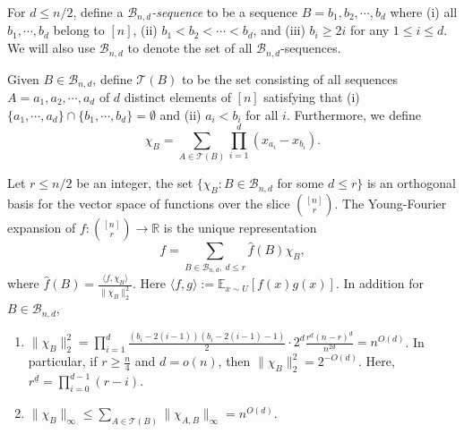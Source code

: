 \documentclass{toc}
\newcommand{\Braket}[1]{\langle#1\rangle}
\begin{document}
%
%
%
%
%
%
%
%
%
%
%
%
%
%
%
%
\begin{definition}
For $d\leq n/2$, define a \emph{$\mathcal{B}_{n,d}$-sequence} to be a sequence $B=b_1,b_2,\cdots,b_d$ where (i) all $b_1,\cdots,b_d$ belong to $[n]$, (ii) $b_1<b_2<\cdots<b_d$, and (iii) $b_i\geq 2i$ for any $1\leq i\leq d$.
We will also use $\mathcal{B}_{n,d}$ to denote the set of all  $\mathcal{B}_{n,d}$-sequences.  

Given $B\in\mathcal{B}_{n,d}$, define $\mathcal{T}(B)$ to be the set consisting of all sequences $A=a_1,a_2,\cdots,a_d$ of $d$ distinct elements of $[n]$ satisfying that (i) $\{a_1,\cdots,a_d\}\cap \{b_1,\cdots,b_d\}=\emptyset$ and (ii) $a_i<b_i$ for all $i$. Furthermore, we define
\begin{equation} 
\chi_B=\sum_{A\in \mathcal{T}(B)} \prod_{i=1}^d(x_{a_i}-x_{b_i}).
\end{equation} %
\end{definition}
%
\begin{theorem}\label{thm:def} %
Let $r\leq n/2$ be an integer, the set $\{\chi_B:B\in \mathcal{B}_{n,d}$ for some $d\leq r \}$ is an orthogonal basis for the vector space of functions over the slice 
%
$\binom{[n]}{r}$. %
The Young-Fourier expansion of $f:
%
\binom{[n]}{r} %
\rightarrow \mathbb{R}$ is the unique representation
%
\begin{equation} %
f=\sum_{B\in \mathcal{B}_{n,d},\ d\leq r}\hat{f}(B)\chi_B,
%
\end{equation} %
where $\hat{f}(B)=\frac{\Braket{f,\chi_B}}{\|\chi_{B}\|_2^2}$. Here $\Braket{f,g}:=\mathbb{E}_{x\sim U}[f(x)g(x)]$. In addition for $B\in \mathcal{B}_{n,d}$,
\begin{enumerate}
  \item $\| \chi_{B}\|_2^2=\prod_{i=1}^{d}\frac{(b_i-2(i-1))(b_i-2(i-1)-1)}{2}\cdot 2^d\frac{r^{\underline{d}}(n-r)^{\underline{d}}}{n^{\underline{2d}}}=n^{O(d)}$. In particular, if $r\geq \frac{n}{4}$ and $d=o(n)$, then %
  $\|\chi_{B}\|_2^2=2^{-O(d)}$. %
  Here, $r^{\underline{d}}=\prod_{i=0}^{d-1}(r-i)$.
  \item $\| \chi_{B}\|_{\infty}\leq\sum_{A\in \mathcal{T}(B)}\|\chi_{A,B}\|_{\infty}=n^{O(d)}$. %
\end{enumerate}
\end{theorem}
\end{document}
